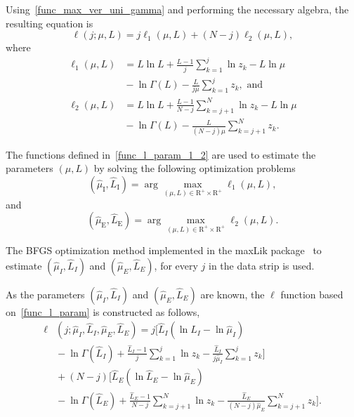 \documentclass[journal]{IEEEtran}
\begin{document}
Using~\eqref{func_max_ver_uni_gamma} and performing the necessary algebra, the resulting equation is 
\begin{equation}\label{func_l_param}
  \ell(j;\mu, L)=j\ell_1(\mu, L) + (N - j)\ell_2(\mu, L),
 \end{equation}
where
\begin{equation}\label{func_l_param_1_2}
\begin{split}
    \ell_1(\mu, L)&=L\ln L+\frac{L-1}{j}\sum_{k=1}^{j}\ln z_k-L\ln\mu\\
    &{}-\ln\Gamma(L) -\frac{L}{j\mu}\sum_{k=1}^{j} z_k,\text{ and}\\
    \ell_2(\mu, L)&=L\ln L+\frac{L-1}{N-j}\sum_{k=j+1}^{N}\ln z_k-L\ln\mu\\
    &{}-\ln\Gamma(L) -\frac{L}{(N-j)\mu}\sum_{k=j+1}^{N} z_k.
 \end{split}
\end{equation}
 
The functions defined in~\eqref{func_l_param_1_2} are used to estimate the parameters $(\mu, L)$ by solving the following optimization problems 
\begin{equation}\label{optimiz_l_1}
(\widehat{\mu}_\text{I},\widehat{L}_\text{I})= \arg\max\limits_{(\mu,L)\in \mathrm{R}^{+}\times\mathrm{R}^{+}}\ell_1(\mu,L),
\end{equation}
and
\begin{equation}\label{optimiz_l_2}
(\widehat{\mu}_\text{E},\widehat{L}_\text{E})= \arg\max\limits_{(\mu,L)\in \mathrm{R}^{+}\times\mathrm{R}^{+}}\ell_2(\mu,L).
\end{equation} 

The BFGS optimization method implemented in the maxLik package~\cite{ht} to estimate $(\widehat{\mu}_I, \widehat{L}_I)$ and $(\widehat{\mu}_E, \widehat{L}_E)$, for every $j$ in the data strip is used.

As the parameters $(\widehat{\mu}_I, \widehat{L}_I)$ and $(\widehat{\mu}_E, \widehat{L}_E)$ are known, the $\ell$ function based on~\eqref{func_l_param} is constructed as follows,
\begin{equation}\label{l_com_paremetros}
 \begin{split}
\ell&(j;\widehat{\mu}_I, \widehat{L}_I,\widehat{\mu}_E, \widehat{L}_E)=j\Bigg[  \widehat{L}_I(\ln \widehat{L}_I -\ln \widehat{\mu}_I) \\
                                          &{}- \ln \Gamma(\widehat{L}_I) + \frac{\widehat{L}_I  - 1}{j} \sum_{k=1}^{j}  \ln z_k -\frac{\widehat{L}_I}{j\widehat{\mu}_I} \sum_{k=1}^{j}   z_k\Bigg] \\
                                   &{}+(N-j)\Bigg[\widehat{L}_E(\ln \widehat{L}_E - \ln \widehat{\mu}_E)\\
                                   &{}-\ln \Gamma(\widehat{L}_E) + \frac{\widehat{L}_E - 1}{N-j} \sum_{k=j+1}^{N}\ln z_k
                                   -\frac{\widehat{L}_E}{(N-j)\widehat{\mu}_E} \sum_{k=j+1}^{N}z_k\Bigg]. \\
 \end{split}
 \end{equation}
 
\end{document}
